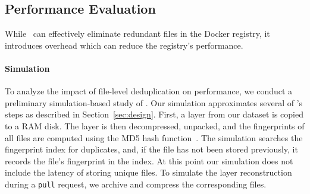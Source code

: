 \subsection{Performance Evaluation}

While \sysname\ can effectively eliminate redundant files in the
Docker registry, it introduces overhead which can reduce the
registry's performance.
%



\paragraph{Simulation}
%
To analyze the impact of file-level deduplication on performance,
we conduct a preliminary simulation-based study of \sysname.
%
%
%
%
%
Our simulation
approximates several of \sysname's steps as described in Section~\ref{sec:design}.
%
First, a layer from our dataset is copied to a RAM disk. 
%
%
%
The layer is then decompressed, unpacked, and the fingerprints of all files
are computed using the MD5 hash function~\cite{MD5}.
%
The simulation searches the fingerprint index for duplicates,
and, if the file has not been stored previously, it records the
file's fingerprint in the index.
%
%
%
%
%
At this point our simulation does not include
the latency of storing unique files.
%
To simulate the layer reconstruction during a \texttt{pull} request,
we archive and compress the corresponding files.
%
%

